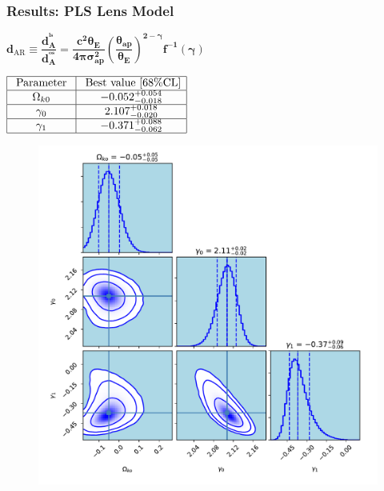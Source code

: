 \documentclass[xcolor=table,bigger]{beamer}
\begin{document}
 \begin{frame}
 \frametitle{Results: \textbf{PLS} Lens Model}
\begin{scriptsize}
  $
{\boxed{\boldsymbol{d_{\mathrm{AR}}\equiv\dfrac{d_{A}^{^{l s}}}{d_{A}^{^{o s}}}=\dfrac{c^{2} \theta_{E}}{4 \pi \sigma_{ap}^{2}}\left(\dfrac{\theta_{a p}}{\theta_{E}}\right)^{2-\gamma} f^{-1}(\gamma)}}}
$
 \end{scriptsize}
 {\footnotesize $\begin{array}{|c|c|}\hline \text { Parameter } & {\text { Best value }[68 \% \mathrm{CL}]} \\ \hline \Omega_{k 0} & {-0.052^{+0.054}_{-0.018}} \\ \hline \gamma_{0} & {2.107_{-0.020}^{+0.018}} \\ \hline \gamma_{1} & {-0.371_{-0.062}^{+0.088}} \\ \hline\end{array}$}
  \begin{figure}[ht!]
\centering
\includegraphics[width=58 mm]{distance_Ratio_161_ok_1_ga0_ga1_corner_without_H0_dec}
\end{figure} 
\end{frame}
\end{document}
